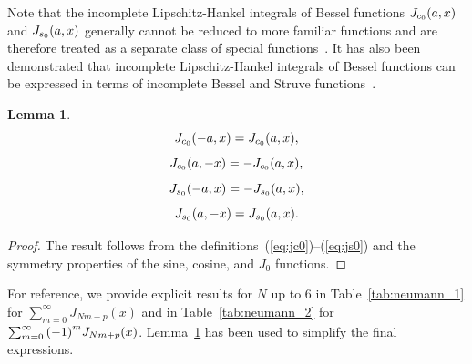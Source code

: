 \documentclass{article}
\newtheorem{lemma}[theorem]{Lemma}
\begin{document}
Note that the incomplete Lipschitz-Hankel integrals of Bessel functions $\JC0(a, x)$ and $\JS0(a, x)$ generally cannot be reduced to more familiar functions and are therefore treated as a separate class of special functions~\cite{Agrest1971}.
It has also been demonstrated that incomplete Lipschitz-Hankel integrals of Bessel functions can be expressed in terms of incomplete Bessel and Struve functions~\cite{Agrest1971}.

\begin{lemma}
\label{lem:ilhi}
\begin{equation}
\JC0(-a, x) = \JC0(a, x),
\end{equation}
\begin{equation}
\label{eq:jc0_mx}
\JC0(a, -x) = -\JC0(a, x),
\end{equation}
\begin{equation}
\JS0(-a, x) = -\JS0(a, x),
\end{equation}
\begin{equation}
\label{eq:js0_mx}
\JS0(a, -x) = \JS0(a, x).
\end{equation}
\end{lemma}
\begin{proof}
The result follows from the definitions~(\ref{eq:jc0})--(\ref{eq:js0}) and the symmetry properties of the sine, cosine, and $J_0$ functions.
\end{proof}

For reference, we provide explicit results for $N$ up to $6$ in Table~\ref{tab:neumann_1} for $\sum_{m=0}^{\infty} J_{Nm+p}(x)$
and in Table~\ref{tab:neumann_2} for $\sum_{m=0}^{\infty} \qty(- 1)^m J_{Nm+p}(x)$.
Lemma~\ref{lem:ilhi} has been used to simplify the final expressions.

\begingroup
\renewcommand{\arraystretch}{2.25}
\end{document}
